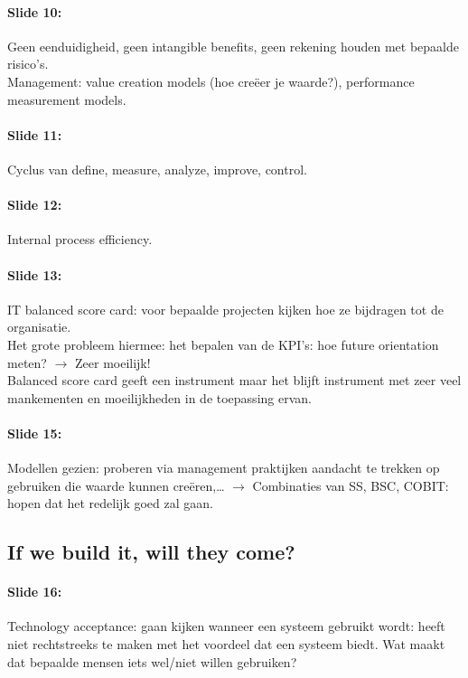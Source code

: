 \documentclass[10pt,a4paper]{report}
\begin{document}
\paragraph{Slide 10:}Geen eenduidigheid, geen intangible benefits, geen rekening houden met bepaalde risico's.\\
Management: value creation models (hoe creëer je waarde?), performance measurement models.

\paragraph{Slide 11:}Cyclus van define, measure, analyze, improve, control.

\paragraph{Slide 12:}Internal process efficiency.

\paragraph{Slide 13:}IT balanced score card: voor bepaalde projecten kijken hoe ze bijdragen tot de organisatie.\\
Het grote probleem hiermee: het bepalen van de KPI's: hoe future orientation meten? $\rightarrow$ Zeer moeilijk!\\
Balanced score card geeft een instrument maar het blijft instrument met zeer veel mankementen en moeilijkheden in de toepassing ervan.

\paragraph{Slide 15:}Modellen gezien: proberen via management praktijken aandacht te trekken op gebruiken die waarde kunnen creëren,… $\rightarrow$ Combinaties van SS, BSC, COBIT: hopen dat het redelijk goed zal gaan.

\subsection{If we build it, will they come?}
\paragraph{Slide 16:}Technology acceptance: gaan kijken wanneer een systeem gebruikt wordt: heeft niet rechtstreeks te maken met het voordeel dat een systeem biedt. Wat maakt dat bepaalde mensen iets wel/niet willen gebruiken?
\end{document}
